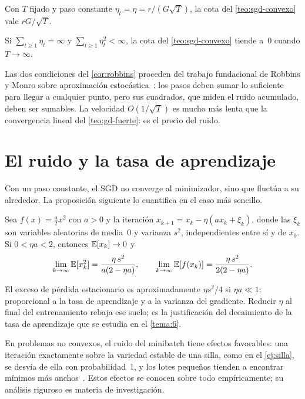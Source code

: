 \begin{corolario}\label{cor:sgd-constante}
Con $T$ fijado y paso constante $\eta_t=\eta=r/(G\sqrt T)$, la cota del \cref{teo:sgd-convexo} vale $rG/\sqrt T$.
\end{corolario}

\begin{corolario}\label{cor:robbins}
Si $\sum_{t\ge 1}\eta_t=\infty$ y $\sum_{t\ge 1}\eta_t^{2}<\infty$, la cota del \cref{teo:sgd-convexo} tiende a~0 cuando $T\to\infty$.
\end{corolario}

Las dos condiciones del \cref{cor:robbins} proceden del trabajo fundacional de Robbins y Monro sobre aproximación estocástica~\cite{robbins}: los pasos deben sumar lo suficiente para llegar a cualquier punto, pero sus cuadrados, que miden el ruido acumulado, deben ser sumables. La velocidad $O(1/\sqrt T)$ es mucho más lenta que la convergencia lineal del \cref{teo:gd-fuerte}: es el precio del ruido.

\section{El ruido y la tasa de aprendizaje}

Con un paso constante, el SGD no converge al minimizador, sino que fluctúa a su alrededor. La proposición siguiente lo cuantifica en el caso más sencillo.

\begin{proposicion}\label{prop:suelo}
Sea $f(x)=\frac{a}{2}x^{2}$ con $a>0$ y la iteración $x_{k+1}=x_k-\eta(ax_k+\xi_k)$, donde las $\xi_k$ son variables aleatorias de media~0 y varianza $s^{2}$, independientes entre sí y de $x_0$. Si $0<\eta a<2$, entonces $\mathbb{E}[x_k]\to 0$ y
\[
\lim_{k\to\infty}\mathbb{E}[x_k^{2}]=\frac{\eta\,s^{2}}{a(2-\eta a)},\qquad
\lim_{k\to\infty}\mathbb{E}[f(x_k)]=\frac{\eta\,s^{2}}{2(2-\eta a)}.
\]
\end{proposicion}

El exceso de pérdida estacionario es aproximadamente $\eta s^{2}/4$ si $\eta a\ll 1$: proporcional a la tasa de aprendizaje y a la varianza del gradiente. Reducir $\eta$ al final del entrenamiento rebaja ese suelo; es la justificación del decaimiento de la tasa de aprendizaje que se estudia en el \cref{tema:6}.

\begin{observacion}
En problemas no convexos, el ruido del minibatch tiene efectos favorables: una iteración exactamente sobre la variedad estable de una silla, como en el \cref{ej:silla}, se desvía de ella con probabilidad~1, y los lotes pequeños tienden a encontrar mínimos más anchos~\cite{keskar}. Estos efectos se conocen sobre todo empíricamente; su análisis riguroso es materia de investigación.
\end{observacion}

